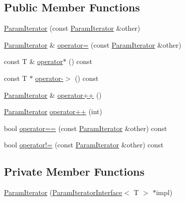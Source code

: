 \subsection*{Public Member Functions}
\begin{DoxyCompactItemize}
\item 
\hyperlink{classtesting_1_1internal_1_1ParamIterator_aa10585055ee055e304703a3004f24f33}{Param\+Iterator} (const \hyperlink{classtesting_1_1internal_1_1ParamIterator}{Param\+Iterator} \&other)
\item 
\hyperlink{classtesting_1_1internal_1_1ParamIterator}{Param\+Iterator} \& \hyperlink{classtesting_1_1internal_1_1ParamIterator_a8019f54ea1c66ca39ffdec47acfabfe6}{operator=} (const \hyperlink{classtesting_1_1internal_1_1ParamIterator}{Param\+Iterator} \&other)
\item 
const T \& \hyperlink{classtesting_1_1internal_1_1ParamIterator_a52e5fdca7d497a0ed358051e36b8b491}{operator$\ast$} () const
\item 
const T $\ast$ \hyperlink{classtesting_1_1internal_1_1ParamIterator_aad035d35e8f0c1412854959a94d4887e}{operator-\/$>$} () const
\item 
\hyperlink{classtesting_1_1internal_1_1ParamIterator}{Param\+Iterator} \& \hyperlink{classtesting_1_1internal_1_1ParamIterator_ab0922f2f554fb3beaf13c442da605e8d}{operator++} ()
\item 
\hyperlink{classtesting_1_1internal_1_1ParamIterator}{Param\+Iterator} \hyperlink{classtesting_1_1internal_1_1ParamIterator_af51e17827dd54977165937550c0fb030}{operator++} (int)
\item 
bool \hyperlink{classtesting_1_1internal_1_1ParamIterator_adc356b4789eb0c2a1b5b033c7874e5a6}{operator==} (const \hyperlink{classtesting_1_1internal_1_1ParamIterator}{Param\+Iterator} \&other) const
\item 
bool \hyperlink{classtesting_1_1internal_1_1ParamIterator_a7a6aee04e8e44b5c8294929951cfac2b}{operator!=} (const \hyperlink{classtesting_1_1internal_1_1ParamIterator}{Param\+Iterator} \&other) const
\end{DoxyCompactItemize}
\subsection*{Private Member Functions}
\begin{DoxyCompactItemize}
\item 
\hyperlink{classtesting_1_1internal_1_1ParamIterator_acf5ad898e7f50eb82a6c367889aa07c4}{Param\+Iterator} (\hyperlink{classtesting_1_1internal_1_1ParamIteratorInterface}{Param\+Iterator\+Interface}$<$ T $>$ $\ast$impl)
\end{DoxyCompactItemize}
